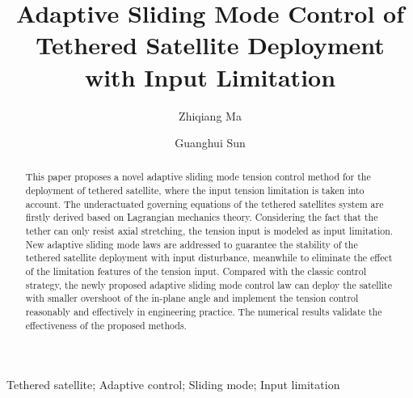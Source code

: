 \documentclass[3p]{elsarticle}
\theoremstyle{plain}
\begin{document}
\begin{frontmatter}
\title{Adaptive Sliding Mode Control of Tethered Satellite  Deployment with Input Limitation}
\author{Zhiqiang Ma}
\author{Guanghui Sun}
\address{Research Institute of Intelligent Control and Systems, Harbin Institute of Technology, Harbin 150001, China}

\begin{abstract}
This paper proposes  a  novel adaptive sliding mode tension control method for  the deployment of tethered satellite, where the input tension limitation is taken into account. The underactuated governing equations of the tethered satellites system are firstly derived based on Lagrangian mechanics theory. Considering the fact that the tether can only resist axial stretching, the tension input is modeled as input limitation. New adaptive sliding mode laws are addressed to guarantee the stability of the tethered satellite deployment with input disturbance, meanwhile to eliminate the effect of the limitation features of the tension input. Compared with the classic control strategy, the newly proposed adaptive sliding mode control law can deploy the satellite with smaller overshoot of the in-plane angle and implement the tension control reasonably and effectively in engineering practice. The numerical results validate the effectiveness of the proposed methods.
\end{abstract}
\begin{keyword}
Tethered satellite;  Adaptive control;  Sliding mode;  Input limitation
\end{keyword}
\end{frontmatter}
\end{document}

